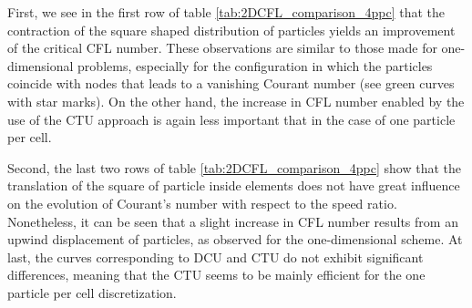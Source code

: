 
First, we see in the first row of table \ref{tab:2DCFL_comparison_4ppc} that the contraction of the square shaped distribution of particles yields an improvement of the critical CFL number.
These observations are similar to those made for one-dimensional problems, especially for the configuration in which the particles coincide with nodes that leads to a vanishing Courant number (see green curves with star marks).
On the other hand, the increase in CFL number enabled by the use of the CTU approach is again less important that in the case of one particle per cell.

Second, the last two rows of table \ref{tab:2DCFL_comparison_4ppc} show that the translation of the square of particle inside elements does not have great influence on the evolution of Courant's number with respect to the speed ratio.
Nonetheless, it can be seen that a slight increase in CFL number results from an upwind displacement of particles, as observed for the one-dimensional scheme.
At last, the curves corresponding to DCU and CTU do not exhibit significant differences, meaning that the CTU seems to be mainly efficient for the one particle per cell discretization.


